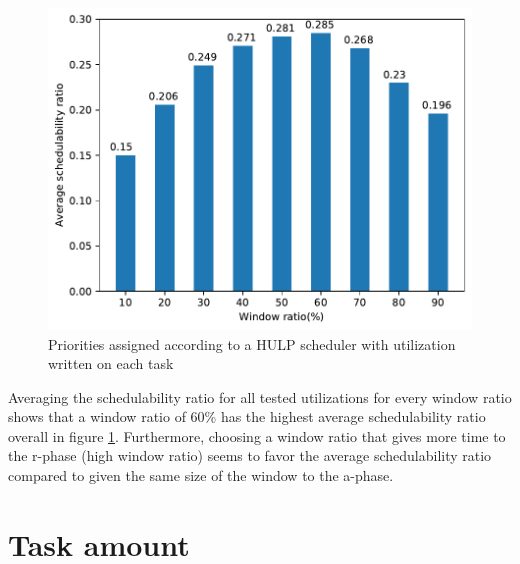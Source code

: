 \documentclass{kththesis}
\begin{document}
\begin{figure}[H]

    \centering

    \includegraphics[width=1.0\linewidth]{images/window_ratio_averages.pdf}

    \caption{Priorities assigned according to a HULP scheduler with utilization written on each task}

    \label{fig:window_ratio_averages}

\end{figure}

Averaging the schedulability ratio for all tested utilizations for every window ratio shows that a
window ratio of 60\% has the highest average schedulability ratio overall in figure
\ref{fig:window_ratio_averages}. Furthermore, choosing a window ratio that gives more time to the
\acrshort{r}-phase (high window ratio) seems to favor the average schedulability ratio compared to
given the same size of the window to the \acrshort{a}-phase.

\section{Task amount} \label{sec:task_amount}
\end{document}
